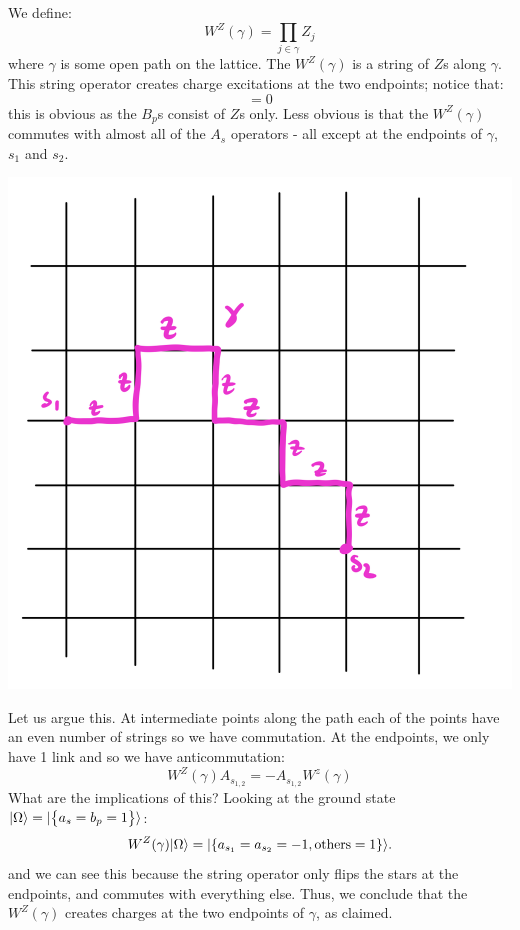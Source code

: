 We define:
\begin{equation}
    W^Z(\gamma) = \prod_{j \in \gamma}Z_j
\end{equation}
where $\gamma$ is some open path on the lattice. The $W^Z(\gamma)$ is a string of $Z$s along $\gamma$. This string operator creates charge excitations at the two endpoints; notice that:
\begin{equation}
    [W^Z(\gamma), B_p] = 0
\end{equation}
this is obvious as the $B_p$s consist of $Z$s only. Less obvious is that the $W^Z(\gamma)$ commutes with almost all of the $A_s$ operators - all except at the endpoints of $\gamma$, $s_1$ and $s_2$. 

\begin{center}
    \includegraphics[scale=0.4]{Lectures/Images/lec1-stringop.png}
\end{center}

Let us argue this. At intermediate points along the path each of the points have an even number of strings so we have commutation. At the endpoints, we only have 1 link and so we have anticommutation:
\begin{equation}
    W^Z(\gamma)A_{s_{1,2}}  = -A_{s_{1,2}}W^z(\gamma)
\end{equation}
What are the implications of this? Looking at the ground state $\lvert \Omega \rangle = \lvert \set{a_s=b_p=1} \rangle$:
\begin{equation}
    W^Z(\gamma)\lvert \Omega \rangle = \lvert \set{a_{s_1} = a_{s_2} = -1, \text{others} = 1} \rangle.
\end{equation}
and we can see this because the string operator only flips the stars at the endpoints, and commutes with everything else. Thus, we conclude that the $W^Z(\gamma)$ creates charges at the two endpoints of $\gamma$, as claimed.

